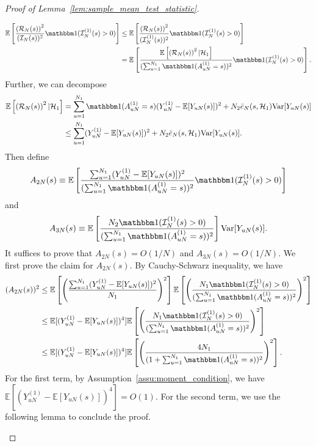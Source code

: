 \documentclass[12pt]{article}
\newcommand{\E}{\mathbb E}								%
\newcommand{\indicator}{\mathbbm 1}						%
\begin{document}
\begin{proof}[Proof of Lemma~\ref{lem:sample_mean_test_statistic}]
\begin{enumerate}
		\begin{align*}
			\E\left[\frac{\left(\mathcal{R}_N(s)\right)^2}{(\mathcal{I}_N(s))^2}\indicator(\mathcal{I}_{N}^{(1)}(s)>0)\right]
			&
			\leq \E\left[\frac{\left(\mathcal{R}_N(s)\right)^2}{(\mathcal{I}_N^{(1)}(s))^2}\indicator(\mathcal{I}_{N}^{(1)}(s)>0)\right]\\
			&
			= \E\left[\frac{\E\left[\left(\mathcal{R}_N(s)\right)^2|\mathcal{H}_1\right]}{(\sum_{u=1}^{N_1}\indicator(A_{uN}^{(1)}=s))^2}\indicator(\mathcal{I}_{N}^{(1)}(s)>0)\right].
		\end{align*}
		Further, we can decompose 
		\small
		\begin{align*}
			\E\left[\left(\mathcal{R}_N(s)\right)^2|\mathcal{H}_1\right]
			&
			=\sum_{u=1}^{N_1}\indicator(A_{uN}^{(1)}=s)(Y_{uN}^{(1)}-\E[Y_{uN}(s)])^2 + N_2\bar e_N(s,\mathcal{H}_1)\mathrm{Var}[Y_{uN}(s)]\\
			&
			\leq \sum_{u=1}^{N_1}(Y_{uN}^{(1)}-\E[Y_{uN}(s)])^2 + N_2\bar e_N(s,\mathcal{H}_1)\mathrm{Var}[Y_{uN}(s)].
		\end{align*}
		\normalsize
		Then define
		\begin{align*}
			A_{2N}(s)\equiv \E\left[\frac{\sum_{u=1}^{N_1}(Y_{uN}^{(1)}-\E[Y_{uN}(s)])^2}{(\sum_{u=1}^{N_1}\indicator(A_{uN}^{(1)}=s))^2}\indicator(\mathcal{I}_{N}^{(1)}(s)>0)\right]
		\end{align*}
		and 
		\begin{align*}
			A_{3N}(s)\equiv \E\left[\frac{N_2\indicator(\mathcal{I}_{N}^{(1)}(s)>0)}{(\sum_{u=1}^{N_1}\indicator(A_{uN}^{(1)}=s))^2}\right]\mathrm{Var}[Y_{uN}(s)].
		\end{align*}
		It suffices to prove that $A_{2N}(s)=O(1/N)$ and $A_{3N}(s)=O(1/N)$. We first prove the claim for $A_{2N}(s)$. By Cauchy-Schwarz inequality, we have
		\begin{align*}
			(A_{2N}(s))^2
			&
			\leq \E\left[\left(\frac{\sum_{u=1}^{N_1}(Y_{uN}^{(1)}-\E[Y_{uN}(s)])^2}{N_1}\right)^2\right]\E\left[\left(\frac{N_1\indicator(\mathcal{I}_{N}^{(1)}(s)>0)}{(\sum_{u=1}^{N_1}\indicator(A_{uN}^{(1)}=s))^2}\right)^2\right]\\
			&
			\leq \E[(Y_{uN}^{(1)}-\E[Y_{uN}(s)])^4]\E\left[\left(\frac{N_1\indicator(\mathcal{I}_{N}^{(1)}(s)>0)}{(\sum_{u=1}^{N_1}\indicator(A_{uN}^{(1)}=s))^2}\right)^2\right]\\
			&
			\leq \E[(Y_{uN}^{(1)}-\E[Y_{uN}(s)])^4]\E\left[\left(\frac{4N_1}{(1+\sum_{u=1}^{N_1}\indicator(A_{uN}^{(1)}=s))^2}\right)^2\right].
		\end{align*}
		For the first term, by Assumption~\ref{assu:moment_condition}, we have $\E[(Y_{uN}^{(1)}-\E[Y_{uN}(s)])^4]=O(1)$. For the second term, we use the following lemma to conclude the proof. 

\end{enumerate}
\end{proof}
\end{document}
